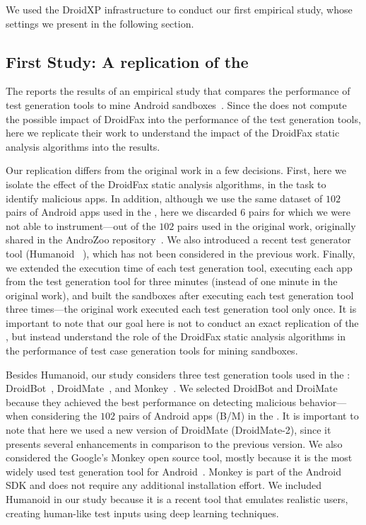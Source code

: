 We used the DroidXP infrastructure to conduct our
first empirical study, whose settings we present in the following section. 

\subsection{First Study: A replication of the \blls}\label{sec:set1}

The \blls reports the results of an empirical study that compares the performance of test generation tools to mine Android
sandboxes~\cite{DBLP:conf/wcre/BaoLL18}. Since the \blls does not
compute the possible impact of DroidFax into the performance of the test generation tools,
here we replicate their work to understand the impact of the DroidFax static analysis algorithms into the \blls results.

Our replication differs from the original work in a few decisions. First, here we isolate
the effect of the DroidFax static analysis algorithms, in the task to identify malicious apps. In addition, although we use the same dataset of
$102$ pairs of Android apps used in the \blls, here we discarded $6$ pairs for which
we were not able to instrument---out of the $102$ pairs used in the original work, originally shared in the AndroZoo repository~\cite{DBLP:conf/msr/AllixBKT16}. We also introduced a recent test generator tool (Humanoid ~\cite{DBLP:conf/kbse/LiY0C19}), which
has not been considered in the previous work. Finally, we extended the execution time of each test generation tool,
executing each app from the test generation tool for three minutes (instead of one minute in the
original work),
and built the sandboxes after executing each test generation tool
three times---the original work executed each test generation tool
only once. It is important to note that our goal here is not to conduct an
exact replication of the \blls, but instead understand
the role of the DroidFax static analysis algorithms in the
performance of test case generation tools for mining sandboxes.

Besides Humanoid, our study considers three test generation tools used in the \blls: DroidBot~\cite{DBLP:conf/icse/LiYGC17},
DroidMate~\cite{DBLP:conf/icse/JamrozikZ16}, and Monkey~\cite{Monkey}. We selected DroidBot and DroiMate because they achieved
the best performance on detecting malicious behavior---when considering the $102$ pairs of Android apps (B/M) in the \blls.
It is important to note that here we used a new version of DroidMate (DroidMate-2), since it presents several enhancements
in comparison to the previous version. We also considered the Google's Monkey open source tool, mostly because it is the most
widely used test generation tool for Android~\cite{DBLP:conf/sigsoft/ZengLZXDLYX16}. Monkey is part of the Android SDK
and does not require any additional installation effort. We included Humanoid in our study
because it is a recent tool that emulates realistic users, creating human-like test inputs using deep learning techniques.

